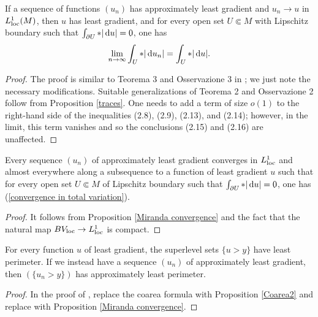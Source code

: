 \begin{proposition}\label{Miranda convergence}
If a sequence of functions $(u_n)$ has approximately least gradient and $u_n \to u$ in $L^1_{\mathrm{loc}}(M)$, then $u$ has least gradient, and for every open set $U \Subset M$ with Lipschitz boundary such that $\int_{\partial U} *|\mathop{}\!\mathrm{d} u| = 0$, one has
\begin{equation}\label{convergence in total variation}
\lim_{n \to \infty} \int_U *|\mathop{}\!\mathrm{d} u_n| = \int_U *|\mathop{}\!\mathrm{d} u|.
\end{equation}
\end{proposition}
\begin{proof}
The proof is similar to Teorema 3 and Osservazione 3 in \cite{Miranda67}; we just note the necessary modifications.
Suitable generalizations of Teorema 2 and Osservazione 2 follow from Proposition \ref{traces}.
One needs to add a term of size $o(1)$ to the right-hand side of the inequalities (2.8), (2.9), (2.13), and (2.14); however, in the limit, this term vanishes and so the conclusions (2.15) and (2.16) are unaffected.
\end{proof}

\begin{corollary}\label{compactness}
Every sequence $(u_n)$ of approximately least gradient converges in $L^1_{\mathrm{loc}}$ and almost everywhere along a subsequence to a function of least gradient $u$ such that for every open set $U \Subset M$ of Lipschitz boundary such that $\int_{\partial U} *|\mathop{}\!\mathrm{d} u| = 0$, one has (\ref{convergence in total variation}).
\end{corollary}
\begin{proof}
It follows from Proposition \ref{Miranda convergence} and the fact that the natural map $BV_{\mathrm{loc}} \to L^1_{\mathrm{loc}}$ is compact.
\end{proof}

\begin{proposition}\label{level sets are minimal}
For every function $u$ of least gradient, the superlevel sets $\{u > y\}$ have least perimeter.
If we instead have a sequence $(u_n)$ of approximately least gradient, then $(\{u_n > y\})$ has approximately least perimeter.
\end{proposition}
\begin{proof}
In the proof of \cite[Theorem 1]{BOMBIERI1969}, replace the coarea formula \cite[Theorem 1.6]{Miranda66} with Proposition \ref{Coarea2} and replace \cite[Teorema 3]{Miranda67} with Proposition \ref{Miranda convergence}.
\end{proof}

